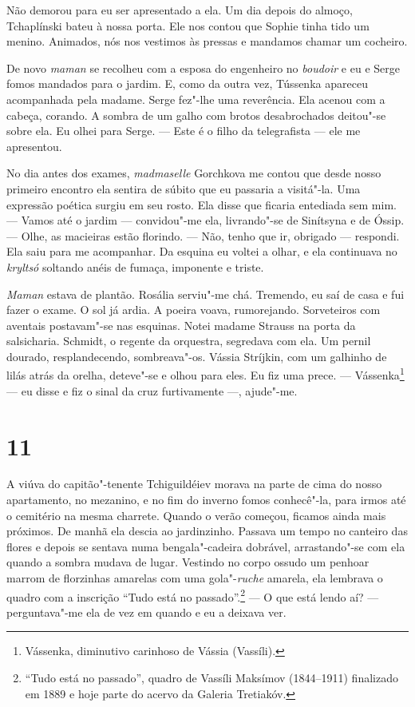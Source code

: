 Não demorou para eu ser apresentado a ela. Um dia depois do almoço,
Tchaplínski bateu à nossa porta. Ele nos contou que Sophie tinha tido um
menino. Animados, nós nos vestimos às pressas e mandamos chamar um
cocheiro.

De novo \emph{maman} se recolheu com a esposa do engenheiro no
\emph{boudoir} e eu e Serge fomos mandados para o jardim. E, como da
outra vez, Tússenka apareceu acompanhada pela madame. Serge fez"-lhe uma
reverência. Ela acenou com a cabeça, corando. A sombra de um galho com
brotos desabrochados deitou"-se sobre ela. Eu olhei para Serge. --- Este
é o filho da telegrafista --- ele me apresentou.

No dia antes dos exames, \emph{madmaselle} Gorchkova me contou que desde
nosso primeiro encontro ela sentira de súbito que eu passaria a
visitá"-la. Uma expressão poética surgiu em seu rosto. Ela disse que
ficaria entediada sem mim. --- Vamos até o jardim --- convidou"-me ela,
livrando"-se de Sinítsyna e de Óssip. --- Olhe, as macieiras estão
florindo. --- Não, tenho que ir, obrigado --- respondi. Ela saiu para me
acompanhar. Da esquina eu voltei a olhar, e ela continuava no
\emph{kryltsó} soltando anéis de fumaça, imponente e triste.

\emph{Maman} estava de plantão. Rosália serviu"-me chá. Tremendo, eu saí
de casa e fui fazer o exame. O sol já ardia. A poeira voava,
rumorejando. Sorveteiros com aventais postavam"-se nas esquinas. Notei
madame Strauss na porta da salsicharia. Schmidt, o regente da orquestra,
segredava com ela. Um pernil dourado, resplandecendo, sombreava"-os.
Vássia Stríjkin, com um galhinho de lilás atrás da orelha, deteve"-se e
olhou para eles. Eu fiz uma prece. --- Vássenka\footnote{Vássenka,
  diminutivo carinhoso de Vássia (Vassíli).} --- eu disse e fiz o sinal
da cruz furtivamente ---, ajude"-me.

\section{11}

A viúva do capitão"-tenente Tchiguildéiev morava na parte de cima do
nosso apartamento, no mezanino, e no fim do inverno fomos conhecê"-la,
para irmos até o cemitério na mesma charrete. Quando o verão começou,
ficamos ainda mais próximos. De manhã ela descia ao jardinzinho. Passava
um tempo no canteiro das flores e depois se sentava numa bengala"-cadeira
dobrável, arrastando"-se com ela quando a sombra mudava de lugar.
Vestindo no corpo ossudo um penhoar marrom de florzinhas amarelas com
uma gola"-\emph{ruche} amarela, ela lembrava o quadro com a inscrição
``Tudo está no passado''.\footnote{``Tudo está no passado'', quadro de
  Vassíli Maksímov (1844--1911) finalizado em 1889 e hoje parte do
  acervo da Galeria Tretiakóv.} --- O que está lendo aí? ---
perguntava"-me ela de vez em quando e eu a deixava ver.

